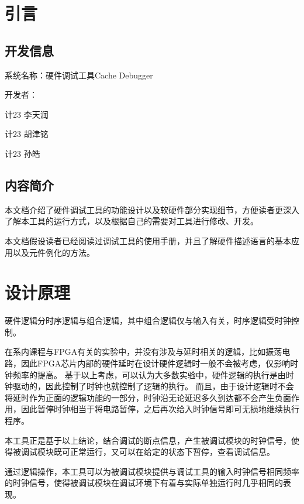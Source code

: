 \section{引言}
    \subsection{开发信息}
        系统名称：硬件调试工具Cache Debugger

        开发者：
        \begin{minipage}[t]{0.8\linewidth}
        计23 李天润

        计23 胡津铭

        计23 孙皓
        \end{minipage}

    \subsection{内容简介}
        本文档介绍了硬件调试工具的功能设计以及软硬件部分实现细节，方便读者更深入了解本工具的运行方式，以及根据自己的需要对工具进行修改、开发。

        本文档假设读者已经阅读过调试工具的使用手册，并且了解硬件描述语言的基本应用以及元件例化的方法。

\section{设计原理}
    硬件逻辑分时序逻辑与组合逻辑，其中组合逻辑仅与输入有关，时序逻辑受时钟控制。

    在系内课程与FPGA有关的实验中，并没有涉及与延时相关的逻辑，比如振荡电路，因此FPGA芯片内部的硬件延时在设计硬件逻辑时一般不会被考虑，仅影响时钟频率的提高。%
    基于以上考虑，可以认为大多数实验中，硬件逻辑的执行是由时钟驱动的，因此控制了时钟也就控制了逻辑的执行。%
    而且，由于设计逻辑时不会将延时作为正面的逻辑功能的一部分，时钟沿无论延迟多久到达都不会产生负面作用，因此暂停时钟相当于将电路暂停，之后再次给入时钟信号即可无损地继续执行程序。

    本工具正是基于以上结论，结合调试的断点信息，产生被调试模块的时钟信号，使得被调试模块既可正常运行，又可以在给定的状态下暂停，查看调试信息。

    通过逻辑操作，本工具可以为被调试模块提供与调试工具的输入时钟信号相同频率的时钟信号，使得被调试模块在调试环境下有着与实际单独运行时几乎相同的表现。
